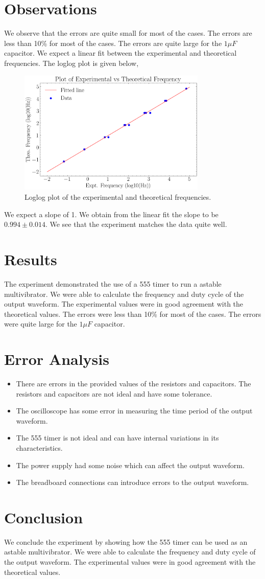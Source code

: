 \documentclass{scrartcl}
\newcommand{\1}{\mathbbm{1}}
\begin{document}
\section{Observations}
We observe that the errors are quite small for most of the cases. The errors are less than 10\% for most of the cases.
The errors are quite large for the $1\mu F$ capacitor. We expect a linear fit between the experimental and theoretical frequencies.
The loglog plot is given below,
\begin{figure}[H]
    \centering
    \includegraphics[width=0.8\textwidth]{expt_vs_theo.png}
    \caption{Loglog plot of the experimental and theoretical frequencies.}
    \label{fig:loglog}
\end{figure}


We expect a slope of 1. We obtain from the linear fit the slope to be $0.994 \pm 0.014$. We see that the
experiment matches the data quite well.

\section{Results}
The experiment demonstrated the use of a 555 timer to run a astable multivibrator. We were able to
calculate the frequency and duty cycle of the output waveform. The experimental values were in good agreement with the theoretical values.
The errors were less than 10\% for most of the cases. The errors were quite large for the $1\mu F$ capacitor.

\section{Error Analysis}
\begin{itemize}
        \item There are errors in the provided values of the resistors and capacitors. The resistors and capacitors are not ideal and have some tolerance.
        \item  The oscilloscope has some error in measuring the time period of the output waveform.
        \item The 555 timer is not ideal and can have internal variations in its characteristics.
        \item The power supply had some noise which can affect the output waveform.
        \item The breadboard connections can introduce errors to the output waveform.
\end{itemize}
\section{Conclusion}
We conclude the experiment by showing how the 555 timer can be used as an astable multivibrator. We were able to calculate the frequency and duty cycle of the output waveform. The experimental values were in good agreement with the theoretical values. 
\end{document}
